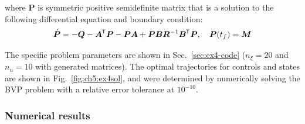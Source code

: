 \noindent where $\bm{P}$ is symmetric positive semidefinite matrix that is a solution to the following differential equation and boundary condition:
\begin{align}
\dot{\bm{P}} = -\bm{Q} - \bm{A}^{\mkern-1.5mu\mathsf{T}} \bm{P} - \bm{P} \bm{A} + \bm{P} \bm{B} \bm{R}^{-1} \bm{B}^{\mkern-1.5mu\mathsf{T}} \bm{P}, \quad \bm{P}(t_f) = \bm{M}
\end{align}

\noindent The specific problem parameters are shown in Sec.~\ref{sec:ex4-code} ($n_\xi = 20$ and $n_u=10$ with generated matrices).
The optimal trajectories for controls and states are shown in Fig.~\ref{fig:ch5:ex4sol}, and were determined by numerically solving the BVP problem with a relative error tolerance at $10^{-10}$.

\subsubsection{Numerical results}

